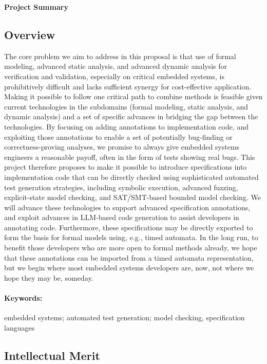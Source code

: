\documentclass[11pt]{article}
\begin{document}

\begin{center}
  \large\bfseries
  Project Summary
\end{center}

\subsection*{Overview}

The core problem we aim to address in this proposal is that use of formal modeling, advanced static analysis, and advanced dynamic analysis for verification and validation, especially on critical embedded systems, is prohibitively difficult and lacks sufficient synergy for cost-effective application. Making it possible to follow one critical path to combine methods is feasible given current technologies in the subdomains (formal modeling, static analysis, and dynamic analysis) and a set of specific advances in bridging the gap between the technologies. By focusing on adding annotations to implementation code, and exploiting those annotations to enable a set of potentially bug-finding or correctness-proving analyses, we promise to always give embedded systems engineers a reasonable payoff, often in the form of tests showing real bugs. This project therefore proposes to make it possible to introduce specifications into implementation code that can be directly checked using sophisticated automated test generation strategies, including symbolic execution, advanced fuzzing, explicit-state model checking, and SAT/SMT-based bounded model checking. We will advance these technologies 
to support advanced specification annotations, and exploit advances in LLM-based code generation to assist developers in annotating code. Furthermore, these specifications may be directly exported to form the basis for formal models using, e.g., timed automata. In the long run, to benefit those developers who are more open to formal methods already, we hope that these annotations can be imported from a timed automata representation, but we begin where most embedded systems developers are, now, not where we hope they may be, someday.

\paragraph{Keywords:} embedded systems; automated test generation; model checking, specification languages

\subsection*{Intellectual Merit}
\end{document}
